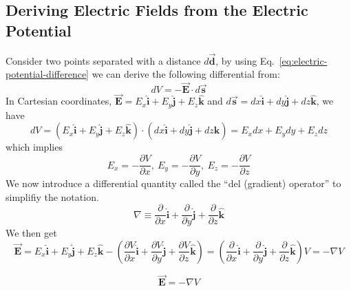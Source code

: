\subsection{Deriving Electric Fields from the Electric Potential}
Consider two points separated with a distance $d\vec{\boldsymbol{d}}$, by using Eq.~\ref{eq:electric-potential-difference} we can derive the following differential from:
\begin{equation*}
  dV = -\vec{\boldsymbol{E}}\cdot d\vec{\boldsymbol{s}}
\end{equation*}
In Cartesian coordinates, $\vec{\boldsymbol{E}}=E_x\hat{\boldsymbol{i}}+E_y\hat{\boldsymbol{j}}+E_z\hat{\boldsymbol{k}}$ and $d\vec{\boldsymbol{s}}=dx\hat{\boldsymbol{i}}+dy\hat{\boldsymbol{j}}+dz\hat{\boldsymbol{k}}$, we have
\begin{equation*}
  dV = \left(E_x\hat{\boldsymbol{i}}+E_y\hat{\boldsymbol{j}}+E_z\hat{\boldsymbol{k}}\right)\cdot\left(dx\hat{\boldsymbol{i}}+dy\hat{\boldsymbol{j}}+dz\hat{\boldsymbol{k}}\right) = E_xdx + E_ydy + E_zdz
\end{equation*}
which implies
\begin{equation*}
  E_x = -\frac{\partial V}{\partial x},\: E_y = -\frac{\partial V}{\partial y},\: E_z = -\frac{\partial V}{\partial z}
\end{equation*}
We now introduce a differential quantity called the ``del (gradient) operator'' to simplifiy the notation.
\begin{equation*}
  \nabla \equiv \frac{\partial}{\partial x} \hat{\boldsymbol{i}} + \frac{\partial}{\partial y} \hat{\boldsymbol{j}} + \frac{\partial}{\partial z} \hat{\boldsymbol{k}} 
\end{equation*}
We then get 
\begin{equation*}
  \vec{\boldsymbol{E}} =  E_x\hat{\boldsymbol{i}} + E_y\hat{\boldsymbol{j}} + E_z\hat{\boldsymbol{k}}
-\left(\frac{\partial V}{\partial x} \hat{\boldsymbol{i}} + \frac{\partial V}{\partial y} \hat{\boldsymbol{j}} + \frac{\partial V}{\partial z} \hat{\boldsymbol{k}}\right)
  = 
  \left(\frac{\partial}{\partial x} \hat{\boldsymbol{i}} + \frac{\partial}{\partial y} \hat{\boldsymbol{j}} + \frac{\partial}{\partial z} \hat{\boldsymbol{k}}\right)V = -\nabla V
\end{equation*}

\begin{equation}\label{eq:electric-field-del-gradient-potential}
  \vec{\boldsymbol{E}} = -\nabla V
\end{equation}

